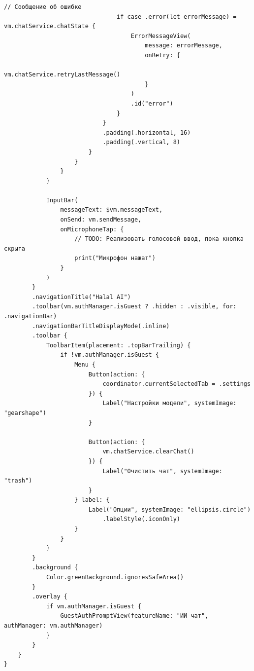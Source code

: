 \begin{lstlisting}[basicstyle=\tiny\ttfamily,breaklines=true]
                                // Сообщение об ошибке
                                if case .error(let errorMessage) = vm.chatService.chatState {
                                    ErrorMessageView(
                                        message: errorMessage,
                                        onRetry: {
                                            vm.chatService.retryLastMessage()
                                        }
                                    )
                                    .id("error")
                                }
                            }
                            .padding(.horizontal, 16)
                            .padding(.vertical, 8)
                        }
                    }
                }
            }
            
            InputBar(
                messageText: $vm.messageText,
                onSend: vm.sendMessage,
                onMicrophoneTap: {
                    // TODO: Реализовать голосовой ввод, пока кнопка скрыта
                    print("Микрофон нажат")
                }
            )
        }
        .navigationTitle("Halal AI")
        .toolbar(vm.authManager.isGuest ? .hidden : .visible, for: .navigationBar)
        .navigationBarTitleDisplayMode(.inline)
        .toolbar {
            ToolbarItem(placement: .topBarTrailing) {
                if !vm.authManager.isGuest {
                    Menu {
                        Button(action: {
                            coordinator.currentSelectedTab = .settings
                        }) {
                            Label("Настройки модели", systemImage: "gearshape")
                        }
                        
                        Button(action: {
                            vm.chatService.clearChat()
                        }) {
                            Label("Очистить чат", systemImage: "trash")
                        }
                    } label: {
                        Label("Опции", systemImage: "ellipsis.circle")
                            .labelStyle(.iconOnly)
                    }
                }
            }
        }
        .background {
            Color.greenBackground.ignoresSafeArea()
        }
        .overlay {
            if vm.authManager.isGuest {
                GuestAuthPromptView(featureName: "ИИ-чат", authManager: vm.authManager)
            }
        }
    }
}
\end{lstlisting}

